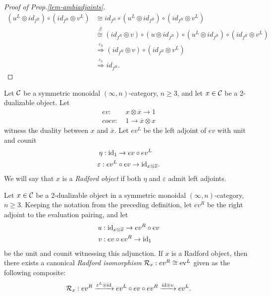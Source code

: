 \documentclass{amsart}
\begin{document}
\begin{proof}[Proof of Prop.\ref{lem-ambiadjoints}]
\begin{align*}
	(u^L \circledcirc id_{f^R}) \circ (id_{f^R} \circledcirc v^L) 
		& \cong  id_{f^R} \circ (u^L \circledcirc id_{f^R}) \circ (id_{f^R} \circledcirc v^L)  \\
		& \stackrel{\beta}{\cong}  (id_{f^R} \circledcirc v) \circ (u \circledcirc id_{f^R} )  \circ (u^L \circledcirc id_{f^R}) \circ (id_{f^R} \circledcirc v^L) \\
		& \stackrel{\varepsilon_u }{\Rightarrow} (id_{f^R} \circledcirc v) \circ (id_{f^R} \circledcirc v^L) \\
		& \stackrel{\varepsilon_v }{\Rightarrow} id_{f^R}.
\end{align*}
\end{proof}

\begin{definition} \label{def:Radford-Object}
	Let $\mathcal C$ be a symmetric monoidal $(\infty,n)$-category, $n \geq 3$, and let $x \in \mathcal C$ be a 2-dualizable object. Let
	\begin{align*}
		ev: & \; x \otimes \overline{x} \to 1 \\
		coev: & \;  1 \to  \overline{x} \otimes x
	\end{align*}
	 witness the duality between $x$ and $\overline{x}$. Let $ev^L$ be the left adjoint of $ev$ with unit and counit
	\begin{align*}
		\eta: & \;  \mathrm{id}_1 \to ev \circ ev^L \\
		\varepsilon: \; & ev^L \circ ev \to \mathrm{id}_{x \otimes \overline{x}}. 
	\end{align*}
	We will say that $x$ is a {\em Radford object} if both $\eta$ and $\varepsilon$ admit left adjoints. 
\end{definition} 

\begin{proposition} \label{prop-Cat_Radford}
	Let $x \in \mathcal C$ be a 2-dualizable object in a symmetric monoidal $(\infty,n)$-category, $n \geq 3$. Keeping the notation from the preceding definition, let $ev^R$ be the right adjoint to the evaluation pairing, and let
	\begin{align*}
		u: & \;  \mathrm{id}_{x \otimes \overline{x}} \to ev^R \circ ev \\
		v: & \; ev \circ ev^R \to \mathrm{id}_1
	\end{align*} 
	be the unit and counit witnessing this adjunction. If $x$ is a Radford object, then there exists a canonical {\em Radford isomorphism} $\mathcal R_x: ev^R \cong \mathrm{ev}^L$ given as the following composite:
	\begin{equation*}
		\mathcal R_x: ev^R \xrightarrow{\varepsilon^L \circledcirc \mathrm{id}} ev^L \circ ev \circ ev^R \xrightarrow{\mathrm{id} \circledcirc v} ev^L.
	\end{equation*}
\end{proposition}
\end{document}
